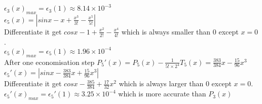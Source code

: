 \documentclass[10pt,twoside,a4paper]{article}
\begin{document}
\begin{itemize}
\\$\epsilon_3(x)_{max}=\epsilon_3(1)\approx 8.14\times10^{-3}$
\\$\epsilon_5(x)=|sinx-x+\frac{x^3}{3!}-\frac{x^5}{5!}|$
\\Differentiate it get $cosx-1+\frac{x^2}{2!}-\frac{x^4}{4!}$ which is always smaller than 0 except $x=0$.
\\$\epsilon_5(x)_{max}=\epsilon_5(1)\approx 1.96\times10^{-4}$
\\After one economisation step $P_5'(x)=P_5(x)-\frac{1}{5!\times 2^4}T_5(x)=\frac{383}{384}x-\frac{15}{96}x^3$
\\$\epsilon_5'(x)=|sinx-\frac{383}{384}x+\frac{15}{96}x^3|$
\\Differentiate it get $cosx-\frac{385}{384}+\frac{17}{32}x^2$ which is always larger than 0 except $x=0$.
\\$\epsilon_5'(x)_{max}=\epsilon_5'(1)\approx 3.25\times10^{-4}$ which is more accurate than $P_3(x)$

\end{itemize}
\end{document}
